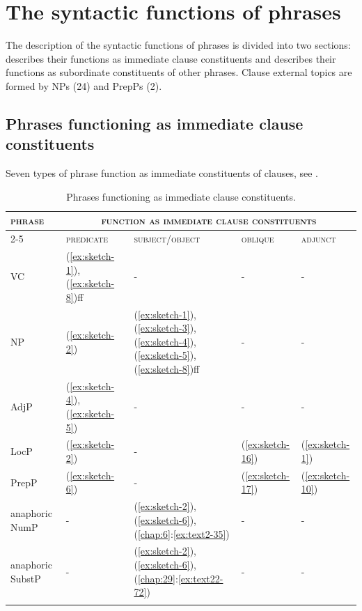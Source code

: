 \documentclass[output=paper]{langscibook}
\begin{document}
\section{The syntactic functions of phrases}\label{sec:synfunc}
The description of the syntactic functions of phrases is divided into two sections:  describes their functions as immediate clause constituents and  describes their functions as subordinate constituents of other phrases. Clause external topics are formed by NPs (24) and PrepPs (2).
\subsection{Phrases functioning as immediate clause constituents}\label{sec:phrasefuncclause}
Seven types of phrase function as immediate constituents of clauses, see .


\begin{table}
        \caption{Phrases functioning as immediate clause constituents.} \label{tab:phrasefunc}
\begin{tabularx}{\textwidth}{lXlXl}
        \lsptoprule
        \textsc{phrase}&\multicolumn{4}{c}{\textsc{function as immediate clause constituents}}\\
        \cmidrule{2-5}
        &\textsc{predicate}&\textsc{subject/object}&\textsc{ob}\textsc{lique}&\textsc{adjunct}\\
        \midrule
        VC&(\ref{ex:sketch-1}), (\ref{ex:sketch-8})ff&-&-&-\\
        NP&(\ref{ex:sketch-2})&(\ref{ex:sketch-1}), (\ref{ex:sketch-3}), (\ref{ex:sketch-4}), (\ref{ex:sketch-5}), (\ref{ex:sketch-8})ff&-&-\\
        AdjP&(\ref{ex:sketch-4}), (\ref{ex:sketch-5})&-&-&-\\
        LocP&(\ref{ex:sketch-2})&-&(\ref{ex:sketch-16})&(\ref{ex:sketch-1})\\
        PrepP&(\ref{ex:sketch-6})&-&(\ref{ex:sketch-17})&(\ref{ex:sketch-10})\\
        anaphoric NumP&-&(\ref{ex:sketch-2}), (\ref{ex:sketch-6}), (\ref{chap:6}:\ref{ex:text2-35})&-&-\\
        anaphoric SubstP&-&(\ref{ex:sketch-2}), (\ref{ex:sketch-6}), (\ref{chap:29}:\ref{ex:text22-72})&-&-\\
        \lspbottomrule
\end{tabularx}
\end{table}
\end{document}
